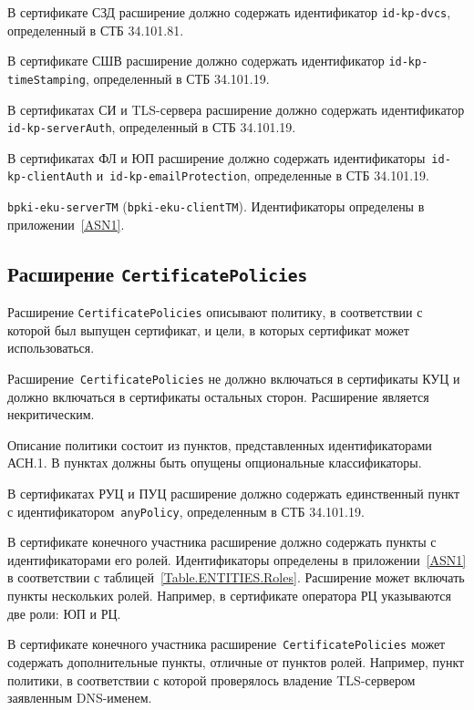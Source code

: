 В сертификате СЗД расширение должно содержать
идентификатор \verb|id-kp-dvcs|, определенный в СТБ 34.101.81.

В сертификате СШВ расширение должно содержать
идентификатор \verb|id-kp-timeStamping|, определенный в СТБ 34.101.19.

В сертификатах СИ и TLS-сервера расширение должно содержать
идентификатор \verb|id-kp-serverAuth|, определенный в СТБ 34.101.19.

В сертификатах ФЛ и ЮП расширение должно содержать
идентификаторы~\verb|id-kp-clientAuth| и~\verb|id-kp-emailProtection|, 
определенные в СТБ 34.101.19.

 \verb|bpki-eku-serverTM| (\verb|bpki-eku-clientTM|). 
Идентификаторы определены в приложении~\ref{ASN1}.

\subsection{Расширение \texttt{CertificatePolicies}}\label{FMT.Ext.CP}

Расширение \texttt{CertificatePolicies} описывают политику, в соответствии 
с которой был выпущен сертификат, и цели, в которых сертификат может 
использоваться. 

Расширение~\texttt{CertificatePolicies} не должно включаться в сертификаты
КУЦ и должно включаться в сертификаты остальных сторон. 
Расширение является некритическим.

Описание политики состоит из пунктов, представленных идентификаторами 
АСН.1. В пунктах должны быть опущены опциональные классификаторы. 

В сертификатах РУЦ и ПУЦ расширение должно содержать единственный пункт
с идентификатором~\texttt{anyPolicy}, определенным в СТБ 34.101.19.

В сертификате конечного участника расширение 
должно содержать пункты с идентификаторами его ролей.
Идентификаторы определены в приложении~\ref{ASN1}
в соответствии с таблицей~\ref{Table.ENTITIES.Roles}. 
Расширение может включать пункты нескольких ролей.
Например, в сертификате оператора РЦ указываются две роли: ЮП и РЦ.

В сертификате конечного участника расширение~\texttt{CertificatePolicies} 
может содержать дополнительные пункты, отличные от пунктов 
ролей. Например, пункт политики, в соответствии с которой 
проверялось владение TLS-сервером заявленным DNS-именем.

